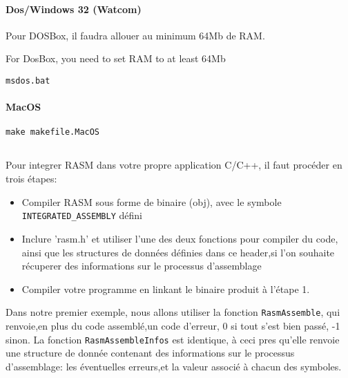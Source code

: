\paragraph{Dos/Windows 32 (Watcom)}

\begin{xfr}
Pour DOSBox, il faudra allouer au minimum 64Mb de RAM.
\end{xfr}
  
\begin{xen}
For DosBox, you need to set RAM to at least 64Mb
\end{xen}

\begin{verbatim}
msdos.bat
\end{verbatim}

\paragraph{MacOS}

\begin{verbatim}
make makefile.MacOS
\end{verbatim}






\subsection{}

\begin{xfr}
Pour integrer RASM dans votre propre application C/C++, il faut procéder en trois étapes:

\begin{itemize}
\item Compiler RASM sous forme de binaire (obj), avec le symbole \texttt{INTEGRATED\_ASSEMBLY} défini
\item Inclure 'rasm.h' et utiliser l'une des deux fonctions pour compiler du code, ainsi que les structures de données définies dans ce header,si l'on souhaite récuperer des informations sur le processus d'assemblage
\item Compiler votre programme en linkant le binaire produit à l'étape 1.
\end{itemize}

Dans notre premier exemple, nous allons utiliser la fonction \texttt{RasmAssemble}, qui renvoie,en plus du code assemblé,un code d'erreur, 0 si tout s'est bien passé, -1 sinon. La fonction \texttt{RasmAssembleInfos} est identique, à ceci pres qu'elle renvoie une structure de donnée contenant des informations sur le processus d'assemblage: les éventuelles erreurs,et la valeur associé à chacun des symboles.
\end{xfr}


